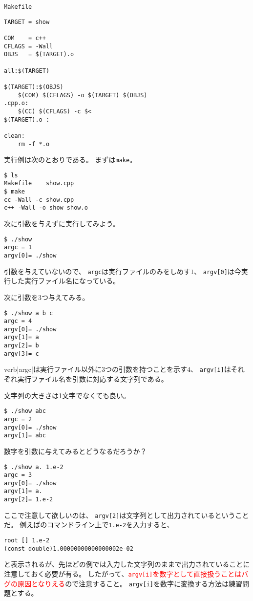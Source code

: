   \begin{itembox}{\texttt{Makefile}}
\begin{verbatim}
TARGET = show

COM    = c++
CFLAGS = -Wall
OBJS   = $(TARGET).o

all:$(TARGET)

$(TARGET):$(OBJS)
	$(COM) $(CFLAGS) -o $(TARGET) $(OBJS)
.cpp.o:
	$(CC) $(CFLAGS) -c $<
$(TARGET).o :

clean:
	rm -f *.o
\end{verbatim}
  \end{itembox}
  
  実行例は次のとおりである。
  まずは\verb|make|。
\begin{verbatim}
$ ls	
Makefile	show.cpp
$ make
cc -Wall -c show.cpp
c++ -Wall -o show show.o
\end{verbatim}
次に引数を与えずに実行してみよう。
\begin{verbatim}
$ ./show
argc = 1
argv[0]= ./show
\end{verbatim}
引数を与えていないので、
\verb|argc|は実行ファイルのみをしめす$1$、
\verb|argv[0]|は今実行した実行ファイル名になっている。

次に引数を3つ与えてみる。
\begin{verbatim}
$ ./show a b c
argc = 4
argv[0]= ./show
argv[1]= a
argv[2]= b
argv[3]= c
\end{verbatim}
verb|argc|は実行ファイル以外に3つの引数を持つことを示す$4$、
\verb|argv[i]|はそれぞれ実行ファイル名を引数に対応する文字列である。

文字列の大きさは1文字でなくても良い。
\begin{verbatim}
$ ./show abc
argc = 2
argv[0]= ./show
argv[1]= abc
\end{verbatim}

数字を引数に与えてみるとどうなるだろうか？
\begin{verbatim}
$ ./show a. 1.e-2
argc = 3
argv[0]= ./show
argv[1]= a.
argv[2]= 1.e-2
\end{verbatim}
ここで注意して欲しいのは、
\verb|argv[2]|は文字列として出力されているということだ。
例えば\ROOT のコマンドライン上で\verb|1.e-2|を入力すると、
\begin{verbatim}
root [] 1.e-2
(const double)1.00000000000000002e-02
\end{verbatim}
と表示されるが、先ほどの例では入力した文字列のままで出力されていることに注意しておく必要が有る。
したがって、\textcolor{red}{\texttt{argv[i]}を数字として直接扱うことはバグの原因となりえる}ので注意すること。
\verb|argv[i]|を数字に変換する方法は練習問題とする。

